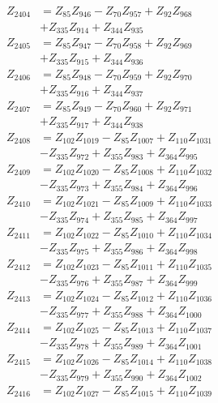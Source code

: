 \begin{multicols}{2}
\begin{align}
Z_{2404} &= Z_{85}Z_{946} - Z_{70}Z_{957} + Z_{92}Z_{968}  \nonumber \\
&+ Z_{335}Z_{914} + Z_{344}Z_{935} \nonumber \\
Z_{2405} &= Z_{85}Z_{947} - Z_{70}Z_{958} + Z_{92}Z_{969}  \nonumber \\
&+ Z_{335}Z_{915} + Z_{344}Z_{936} \nonumber \\
Z_{2406} &= Z_{85}Z_{948} - Z_{70}Z_{959} + Z_{92}Z_{970}  \nonumber \\
&+ Z_{335}Z_{916} + Z_{344}Z_{937} \nonumber \\
Z_{2407} &= Z_{85}Z_{949} - Z_{70}Z_{960} + Z_{92}Z_{971}  \nonumber \\
&+ Z_{335}Z_{917} + Z_{344}Z_{938} \nonumber \\
Z_{2408} &= Z_{102}Z_{1019} - Z_{85}Z_{1007} + Z_{110}Z_{1031}  \nonumber \\
&- Z_{335}Z_{972} + Z_{355}Z_{983} + Z_{364}Z_{995} \nonumber \\
Z_{2409} &= Z_{102}Z_{1020} - Z_{85}Z_{1008} + Z_{110}Z_{1032}  \nonumber \\
&- Z_{335}Z_{973} + Z_{355}Z_{984} + Z_{364}Z_{996} \nonumber \\
Z_{2410} &= Z_{102}Z_{1021} - Z_{85}Z_{1009} + Z_{110}Z_{1033}  \nonumber \\
&- Z_{335}Z_{974} + Z_{355}Z_{985} + Z_{364}Z_{997} \nonumber \\
Z_{2411} &= Z_{102}Z_{1022} - Z_{85}Z_{1010} + Z_{110}Z_{1034}  \nonumber \\
&- Z_{335}Z_{975} + Z_{355}Z_{986} + Z_{364}Z_{998} \nonumber \\
Z_{2412} &= Z_{102}Z_{1023} - Z_{85}Z_{1011} + Z_{110}Z_{1035}  \nonumber \\
&- Z_{335}Z_{976} + Z_{355}Z_{987} + Z_{364}Z_{999} \nonumber \\
Z_{2413} &= Z_{102}Z_{1024} - Z_{85}Z_{1012} + Z_{110}Z_{1036}  \nonumber \\
&- Z_{335}Z_{977} + Z_{355}Z_{988} + Z_{364}Z_{1000} \nonumber \\
Z_{2414} &= Z_{102}Z_{1025} - Z_{85}Z_{1013} + Z_{110}Z_{1037}  \nonumber \\
&- Z_{335}Z_{978} + Z_{355}Z_{989} + Z_{364}Z_{1001} \nonumber \\
Z_{2415} &= Z_{102}Z_{1026} - Z_{85}Z_{1014} + Z_{110}Z_{1038}  \nonumber \\
&- Z_{335}Z_{979} + Z_{355}Z_{990} + Z_{364}Z_{1002} \nonumber \\
Z_{2416} &= Z_{102}Z_{1027} - Z_{85}Z_{1015} + Z_{110}Z_{1039}  \nonumber \\

\end{align}
\end{multicols}
